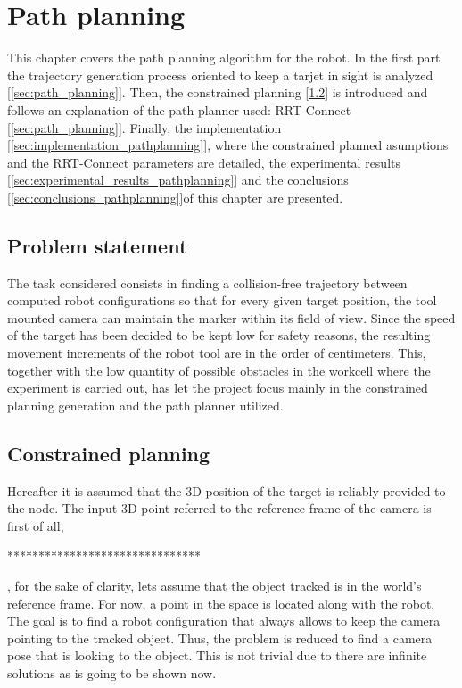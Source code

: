 \chapter{Path planning} %
\label{chap:path_planning}

This chapter covers the path planning algorithm for the robot.
In the first part the trajectory generation process oriented to keep a tarjet in sight is analyzed [\ref{sec:path_planning}]. Then, the constrained planning [\ref{sec:constrained_planning}] is introduced and follows an explanation of the path planner used: RRT-Connect [\ref{sec:path_planning}]. Finally, the implementation [\ref{sec:implementation_pathplanning}], where the constrained planned asumptions and the RRT-Connect parameters are detailed, the experimental results [\ref{sec:experimental_results_pathplanning}] and the conclusions [\ref{sec:conclusions_pathplanning}]of this chapter are presented.

\section{Problem statement} %
\label{sec:path_planning_in_keep_object_in_sight}
The task considered consists in finding a collision-free trajectory between computed robot configurations so that for every given target position, the tool mounted camera can maintain the marker within its field of view. 
Since the speed of the target has been decided to be kept low for safety reasons, the resulting movement increments of the robot tool are in the order of centimeters. 
This, together with the low quantity of possible obstacles in the workcell where the experiment is carried out, has let the project focus mainly in the constrained planning generation and the path planner utilized.

\section{Constrained planning} %
\label{sec:constrained_planning}
Hereafter it is assumed that the 3D position of the target is reliably provided to the node.
The input 3D point referred to the reference frame of the camera is first of all, 

*******************************

, for the sake of clarity, lets assume that the object tracked is in the world's reference frame. 
For now, a point in the space is located along with the robot.
The goal is to find a robot configuration that always allows to keep the camera pointing to the tracked object.
Thus, the problem is reduced to find a camera pose that is looking to the object.
This is not trivial due to there are infinite solutions as is going to be shown now. \\

